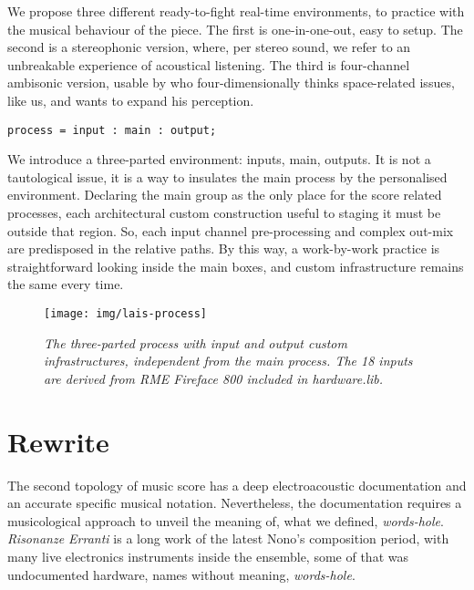 \documentclass[twoside,a4paper]{article}
\begin{document}
We propose three different ready-to-fight real-time environments, to practice with the musical behaviour of the piece. The first is one-in-one-out, easy to setup. The second is a stereophonic version, where, per stereo sound, we refer to an unbreakable experience of acoustical listening. \cite{ab58} The third is four-channel ambisonic version, usable by who four-dimensionally thinks space-related issues, like us, and wants to expand his perception.

\begin{lstlisting}
process = input : main : output;
\end{lstlisting}

We introduce a three-parted environment: inputs, main, outputs. It is not a tautological issue, it is a way to insulates the main process by the personalised environment. Declaring the main group as the only place for the score related processes, each architectural custom construction useful to staging it must be outside that region. So, each input channel pre-processing and complex out-mix are predisposed in the relative paths. By this way, a work-by-work practice is straightforward looking inside the main boxes, and custom infrastructure remains the same every time.

\begin{figure}[ht]
\centerline{\texttt{[image: img/lais-process]}}
\caption{\label{re-dia-6c}{\it The three-parted process with input and output custom infrastructures, independent from the main process. The 18 inputs are derived from \emph{RME Fireface 800} included in \emph{hardware.lib}.}}
\end{figure}


\section{Rewrite}
\label{sec:rewriting}

The second topology of music score has a deep electroacoustic documentation and an accurate specific musical notation. Nevertheless, the documentation requires a musicological approach to unveil the meaning of, what we defined, \emph{words-hole}. \emph{Risonanze Erranti} is a long work of the latest Nono's composition period, with many live electronics instruments inside the ensemble, some of that was undocumented hardware, names without meaning, \emph{words-hole}.
\end{document}
